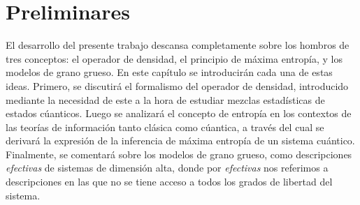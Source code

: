 \chapter{Preliminares}
El desarrollo del presente trabajo descansa completamente sobre los hombros de tres conceptos: el operador de densidad, el principio de máxima entropía, y los modelos de grano grueso. En este capítulo se introducirán cada una de estas ideas. Primero, se discutirá el formalismo del operador de densidad, introducido mediante la necesidad de este a la hora de estudiar mezclas estadísticas de estados cúanticos. Luego se analizará el concepto de entropía en los contextos de las teorías de información tanto clásica como cúantica, a través del cual se derivará la expresión de la inferencia de máxima entropía de un sistema cuántico. Finalmente, se comentará sobre los modelos de grano grueso, como descripciones \textit{efectivas} de sistemas de dimensión alta, donde por \textit{efectivas} nos referimos a descripciones en las que no se tiene acceso a todos los grados de libertad del sistema. 






\newpage